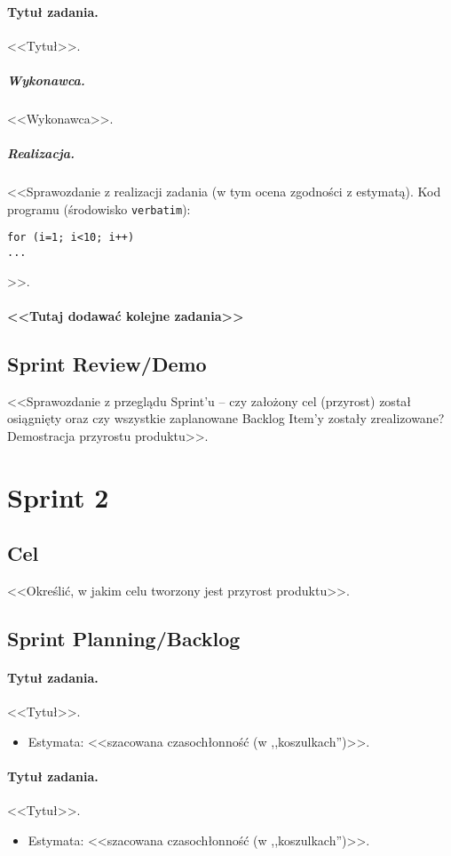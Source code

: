\documentclass[a4paper]{article}
\begin{document}
\paragraph{Tytuł zadania.} <<Tytuł>>.
\subparagraph{Wykonawca.} <<Wykonawca>>.
\subparagraph{Realizacja.} <<Sprawozdanie z realizacji zadania (w tym ocena zgodności z estymatą). Kod programu (środowisko \texttt{verbatim}): \begin{verbatim}
for (i=1; i<10; i++)
...
\end{verbatim}>>.

\paragraph{<<Tutaj dodawać kolejne zadania>>}


\subsection{Sprint Review/Demo}
<<Sprawozdanie z przeglądu Sprint'u -- czy założony cel (przyrost) został osiągnięty oraz czy wszystkie zaplanowane Backlog Item'y zostały zrealizowane? Demostracja przyrostu produktu>>.

\section{Sprint 2}

\subsection{Cel} <<Określić, w jakim celu tworzony jest przyrost produktu>>.

\subsection{Sprint Planning/Backlog}

\paragraph{Tytuł zadania.} <<Tytuł>>.
\begin{itemize}
\item Estymata: <<szacowana czasochłonność (w ,,koszulkach'')>>.
\end{itemize}

\paragraph{Tytuł zadania.} <<Tytuł>>.
\begin{itemize}
\item Estymata: <<szacowana czasochłonność (w ,,koszulkach'')>>.
\end{itemize}
\end{document}
